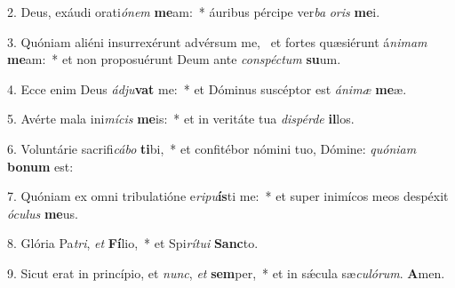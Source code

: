 2. Deus, exáudi orati\textit{ó}\textit{nem} \textbf{me}am:~*  áuribus pércipe ver\textit{ba} \textit{o}\textit{ris} \textbf{me}i.\

3. Quóniam aliéni insurrexérunt advérsum me, \dag\  et fortes quæsiérunt á\textit{ni}\textit{mam} \textbf{me}am:~*  et non proposuérunt Deum ante \textit{con}\textit{spéc}\textit{tum} \textbf{su}um.\

4. Ecce enim Deus \textit{ád}\textit{ju}\textbf{vat} me:~*  et Dóminus suscéptor est \textit{á}\textit{ni}\textit{mæ} \textbf{me}æ.\

5. Avérte mala ini\textit{mí}\textit{cis} \textbf{me}is:~*  et in veritáte tua \textit{dis}\textit{pér}\textit{de} \textbf{il}los.\

6. Voluntárie sacrifi\textit{cá}\textit{bo} \textbf{ti}bi,~*  et confitébor nómini tuo, Dómine: \textit{quón}\textit{i}\textit{am} \textbf{bo}\textbf{num} est:\

7. Quóniam ex omni tribulatióne e\textit{ri}\textit{pu}\textbf{ís}ti me:~*  et super inimícos meos despéxit \textit{ó}\textit{cu}\textit{lus} \textbf{me}us.\

8. Glória Pa\textit{tri}, \textit{et} \textbf{Fí}lio,~*  et Spi\textit{rí}\textit{tu}\textit{i} \textbf{Sanc}to.\

9. Sicut erat in princípio, et \textit{nunc}, \textit{et} \textbf{sem}per,~*  et in sǽcula sæ\textit{cu}\textit{ló}\textit{rum}. \textbf{A}men.\

